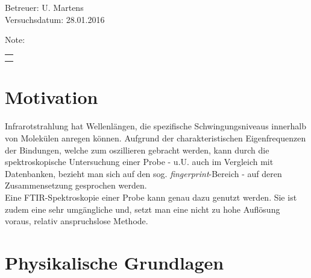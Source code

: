 \documentclass[a4paper,10pt,twocolumn]{article}
\title{\fett{\underline{Protokoll: FTIR-Spektroskopie}}} %
\author{Alexander Jankowski, Philipp Hacker}
\date{\today}
\newcommand{\tilt}[1]{\textit{#1}}
\begin{document}
	\renewcommand*{\equationautorefname}{Gl.}
	\renewcommand*{\figureautorefname}{Abb.}
	\renewcommand*{\tableautorefname}{Tab.}
	\renewcommand*{\sectionautorefname}{Abschn.}
	\renewcommand*{\subsectionautorefname}{Abschn.}
	\renewcommand*{\subsubsectionautorefname}{Abschn.}
	\renewcommand*{\figurename}{Abb. }
	\renewcommand*{\tablename}{Tab.}

	\renewcommand*{\figurename}{Abbildung }
	\renewcommand*{\tablename}{Tabelle}

	
	\onecolumn
	\maketitle

	\begin{center}
		Betreuer: U. Martens\\ %
		Versuchsdatum: 28.01.2016 \\ %
		\begin{table}[h]
			\centering
			Note: %
			\begin{tabularx}{1.5cm}{|X|}
				\hline \\ \\
				\hline
			\end{tabularx}
		\end{table}
	\end{center}


	\vspace*{\fill}
	\tableofcontents
	\vfill
	\clearpage
	\twocolumn

	\section{Motivation}

		Infrarotstrahlung hat Wellenl\"angen, die spezifische Schwingungsniveaus innerhalb von Molek\"ulen anregen k\"onnen. Aufgrund der charakteristischen Eigenfrequenzen der Bindungen, welche zum oszillieren gebracht werden, kann durch die spektroskopische Untersuchung einer Probe - u.U. auch im Vergleich mit  Datenbanken, bezieht man sich auf den sog. \tilt{fingerprint}-Bereich - auf deren Zusammensetzung gesprochen werden.\\
		Eine FTIR-Spektroskopie einer Probe kann genau dazu genutzt werden. Sie ist zudem eine sehr umg\"angliche und, setzt man eine nicht zu hohe Aufl\"osung voraus, relativ anspruchslose Methode.

	\section{Physikalische Grundlagen}
\end{document}
